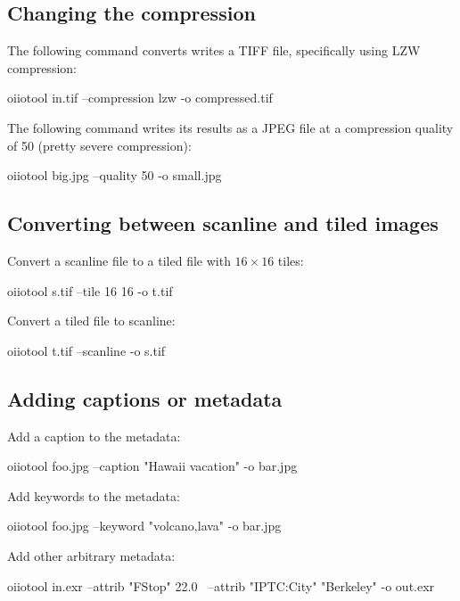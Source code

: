 \subsection*{Changing the compression}

The following command converts writes a TIFF file, specifically using
LZW compression:

\begin{code}
    oiiotool in.tif --compression lzw -o compressed.tif
\end{code}

The following command writes its results as a JPEG file at a 
compression quality of 50 (pretty severe compression):

\begin{code}
    oiiotool big.jpg --quality 50 -o small.jpg
\end{code}



\subsection*{Converting between scanline and tiled images}

Convert a scanline file to a tiled file with $16 \times 16$ tiles:

\begin{code}
    oiiotool s.tif --tile 16 16 -o t.tif
\end{code}

\noindent Convert a tiled file to scanline:

\begin{code}
    oiiotool t.tif --scanline -o s.tif
\end{code}



\subsection*{Adding captions or metadata}

\noindent Add a caption to the metadata:
\begin{code}
    oiiotool foo.jpg --caption "Hawaii vacation" -o bar.jpg
\end{code}

\noindent Add keywords to the metadata:
\begin{code}
    oiiotool foo.jpg --keyword "volcano,lava" -o bar.jpg
\end{code}

\noindent Add other arbitrary metadata:
\begin{code}
    oiiotool in.exr --attrib "FStop" 22.0 \
            --attrib "IPTC:City" "Berkeley" -o out.exr
\end{code}


